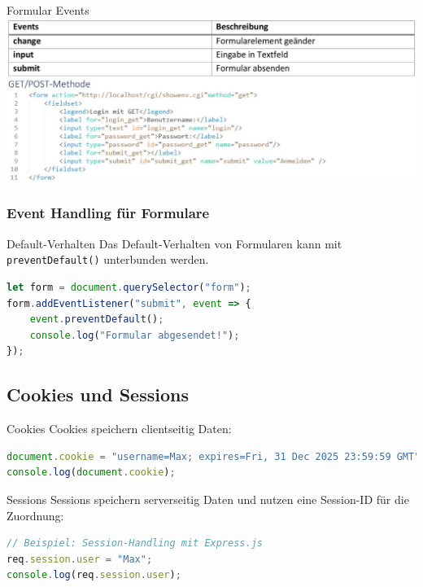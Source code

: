Formular Events\\
\includegraphics[width=\linewidth]{images/2024_12_29_858f09cde51177c71657g-30}

\subsubsection{Event Handling für Formulare}
\begin{definition}{Default-Verhalten}
Das Default-Verhalten von Formularen kann mit \texttt{preventDefault()} unterbunden werden.
\begin{lstlisting}[language=JavaScript, style=basesmol]
let form = document.querySelector("form");
form.addEventListener("submit", event => {
    event.preventDefault();
    console.log("Formular abgesendet!");
});
\end{lstlisting}
\end{definition}

\subsection{Cookies und Sessions}

\begin{definition}{Cookies}
Cookies speichern clientseitig Daten:
\begin{lstlisting}[language=JavaScript, style=basesmol]
document.cookie = "username=Max; expires=Fri, 31 Dec 2025 23:59:59 GMT";
console.log(document.cookie);
\end{lstlisting}
\end{definition}

\begin{definition}{Sessions}
Sessions speichern serverseitig Daten und nutzen eine Session-ID für die Zuordnung:
\begin{lstlisting}[language=JavaScript, style=basesmol]
// Beispiel: Session-Handling mit Express.js
req.session.user = "Max";
console.log(req.session.user);
\end{lstlisting}
\end{definition}

